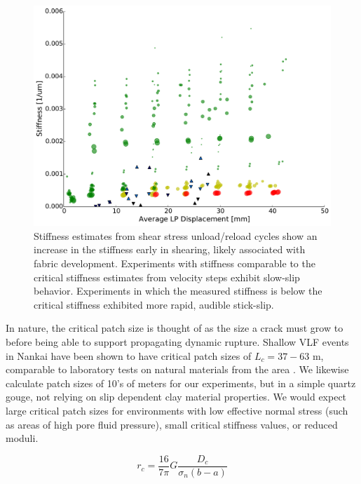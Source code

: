 \documentclass[11pt]{article}
\begin{document}
\begin{figure}
    \centering
        \includegraphics[scale=0.4]{../Figures/Fig_Stiffness_Evolution/Stiffness_Evolution.pdf}
       \caption{Stiffness estimates from shear stress unload/reload cycles show
       an increase in the stiffness early in shearing, likely associated with
       fabric development. Experiments with stiffness comparable to the critical stiffness
       estimates from velocity steps exhibit slow-slip behavior. Experiments in
       which the measured stiffness is below the critical stiffness exhibited
       more rapid, audible stick-slip.}
      \label{Figure:Stiffness Evolution}
\end{figure}

In nature, the critical patch size is thought of as the size a crack must grow
to before being able to support propagating dynamic rupture. Shallow VLF events in
Nankai have been shown to have critical patch sizes of $L_c = 37-63$ m,
comparable to laboratory tests on natural materials from the area
\cite{Ikari:2013}. We likewise calculate  patch sizes of 10's of meters for our
experiments, but in a simple quartz gouge,  not relying on slip dependent clay
material properties. We would expect large critical patch sizes for environments
with low effective normal stress (such as areas of high pore fluid pressure),
small critical stiffness values, or reduced moduli.

\begin{equation}
    r_c = \frac{16}{7\pi}G \frac{D_c}{\sigma_n (b-a)}
    \label{equation:rc}
\end{equation}
\end{document}
